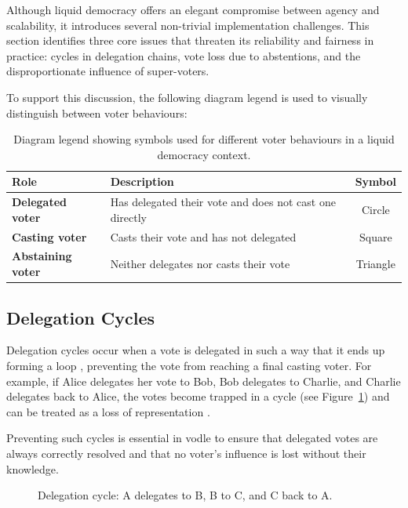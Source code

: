 Although liquid democracy offers an elegant compromise between agency and scalability, it introduces several non-trivial implementation challenges. This section identifies three core issues that threaten its reliability and fairness in practice: cycles in delegation chains, vote loss due to abstentions, and the disproportionate influence of super-voters.

To support this discussion, the following diagram legend is used to visually distinguish between voter behaviours:

\begin{table}[H]
  \centering
  \begin{tabular}{|l|l|c|}
  \hline
  \textbf{Role} & \textbf{Description} & \textbf{Symbol}\\ \hline
  \textbf{Delegated voter} & Has delegated their vote and does not cast one directly & Circle \\
  \textbf{Casting voter} & Casts their vote and has not delegated & Square \\
  \textbf{Abstaining voter} & Neither delegates nor casts their vote & Triangle \\
  \hline
  \end{tabular}
  \caption{Diagram legend showing symbols used for different voter behaviours in a liquid democracy context.}
\end{table}  

\subsection*{Delegation Cycles}\label{subsec:delegation_cycles}
Delegation cycles occur when a vote is delegated in such a way that it ends up forming a loop \citep{brill_liquid_2022}, preventing the vote from reaching a final casting voter. For example, if Alice delegates her vote to Bob, Bob delegates to Charlie, and Charlie delegates back to Alice, the votes become trapped in a cycle (see Figure~\ref{fig:triangle-cycle}) and can be treated as a loss of representation \citep{christoff2017liquiddemocracyanalysisbinary}.

Preventing such cycles is essential in vodle to ensure that delegated votes are always correctly resolved and that no voter's influence is lost without their knowledge.

\begin{figure}[H]
  \centering
  \caption{Delegation cycle: A delegates to B, B to C, and C back to A.}
  \label{fig:triangle-cycle}
\end{figure}

